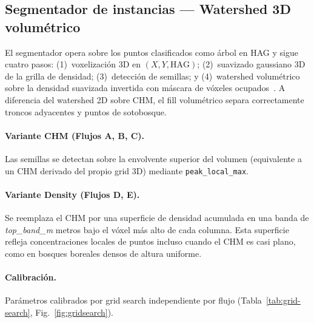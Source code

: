 \documentclass{cys}
\begin{document}
\subsection{Segmentador de instancias --- Watershed 3D volum\'etrico}\label{sec:watershed}

El segmentador opera sobre los puntos clasificados como \'arbol en HAG y sigue cuatro pasos: (1)~voxelizaci\'on 3D en $(X, Y, \text{HAG})$; (2)~suavizado gaussiano 3D de la grilla de densidad; (3)~detecci\'on de semillas; y (4)~watershed volum\'etrico sobre la densidad suavizada invertida con m\'ascara de v\'oxeles ocupados~\cite{dalponte2016}. A diferencia del watershed 2D sobre CHM, el fill volum\'etrico separa correctamente troncos adyacentes y puntos de sotobosque.

\paragraph{Variante CHM (Flujos A, B, C).} Las semillas se detectan sobre la envolvente superior del volumen (equivalente a un CHM derivado del propio grid 3D) mediante \texttt{peak\_local\_max}.

\paragraph{Variante Density (Flujos D, E).} Se reemplaza el CHM por una superficie de densidad acumulada en una banda de \emph{top\_band\_m} metros bajo el v\'oxel m\'as alto de cada columna. Esta superficie refleja concentraciones locales de puntos incluso cuando el CHM es casi plano, como en bosques boreales densos de altura uniforme.

\paragraph{Calibraci\'on.}
Par\'ametros calibrados por grid search independiente por flujo (Tabla~\ref{tab:grid-search}, Fig.~\ref{fig:gridsearch}).

\begin{table}[H]
\centering
\caption{Par\'ametros \'optimos del Watershed~3D por flujo (grid search sobre val, F1 inst.\ IoU~3D~$\geq 0.5$).}\label{tab:grid-search}
\end{table}
\end{document}
